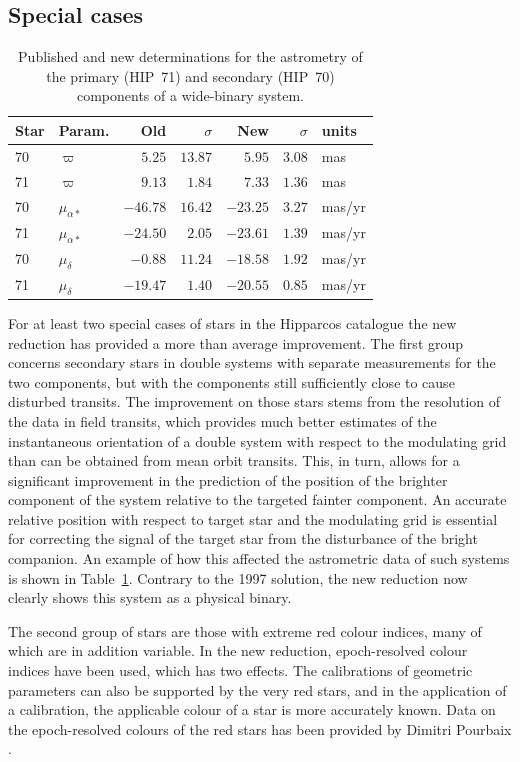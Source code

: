\documentclass{aa}
\begin{document}
\subsection{Special cases}

\begin{table}
\caption[]{Published and new determinations for the
astrometry of the primary (HIP~71) and secondary (HIP~70) components of
a wide-binary system.}
\begin{tabular}{llrrrrl}\hline
Star & Param. & Old & $\sigma$ & New & $\sigma$ & units \\\hline
70 & $\varpi$ & $5.25$ & $13.87$ & $5.95$ & $3.08$ & mas \\
71 & $\varpi$ & $9.13$ & $1.84$ & $7.33$ & $1.36$ & mas \\
70 & $\mu_{\alpha *}$ & $-46.78$ & $16.42$ & $-23.25$ & $3.27$ & mas/yr \\
71 & $\mu_{\alpha *}$ & $-24.50$ & $2.05$ & $-23.61$ & $1.39$ & mas/yr \\
70 & $\mu_\delta$ & $-0.88$ & $11.24$ & $-18.58$ & $1.92$ & mas/yr \\
71 & $\mu_\delta$ & $-19.47$ & $1.40$ & $-20.55$ & $0.85$ & mas/yr \\
\hline
\end{tabular}
\label{tab:hip70_71}
\end{table}
For at least two special cases of stars in the Hipparcos catalogue the new
reduction has provided a more than average improvement. The first group
concerns secondary stars in double systems with separate measurements for the
two components, but with the components still sufficiently close to cause
disturbed transits. The improvement on those stars stems from the resolution 
of the data in field transits, which provides much better estimates of the
instantaneous orientation of a double system with respect to the modulating
grid than can be obtained from mean orbit transits. This, in turn, allows for 
a significant improvement in the prediction of the position of the brighter
component of the system relative to the targeted fainter component. An 
accurate relative position with respect to target star and the modulating
grid is essential for correcting the signal of the target star from the
disturbance of the bright companion. An example of how this affected the
astrometric data of such systems is shown in Table~\ref{tab:hip70_71}.
Contrary to the 1997 solution, the new reduction now clearly shows this
system as a physical binary.

The second group of stars are those with extreme red colour indices, many of
which are in addition variable. In the new reduction, epoch-resolved
colour indices have been used, which has two effects. The calibrations
of geometric parameters can also be supported by the very red stars, and
in the application of a calibration, the applicable colour of a star is
more accurately known. Data on the epoch-resolved colours of the red stars
has been provided by Dimitri Pourbaix \citep[see further:][]{platais03,knapp01,
knapp03}.
\end{document}

